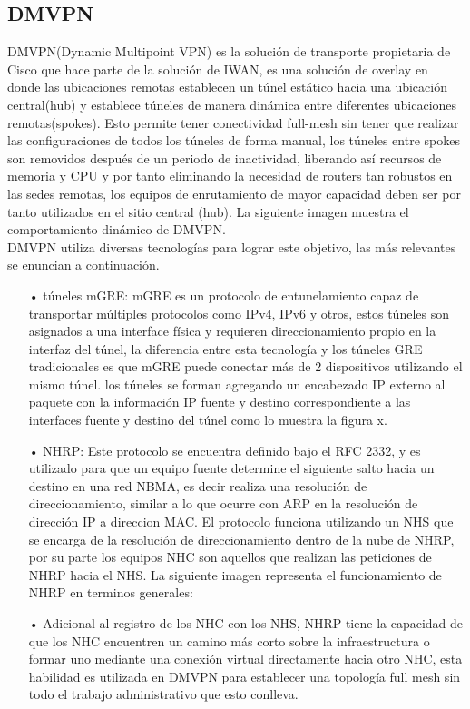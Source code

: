 \subsection{DMVPN}
\label{sec:DMVPN}

DMVPN(Dynamic Multipoint VPN) es la solución de transporte propietaria de Cisco que hace parte de la solución de IWAN, es una solución de overlay en donde las ubicaciones remotas establecen un túnel estático hacia una ubicación central(hub) y establece túneles de manera dinámica entre diferentes ubicaciones remotas(spokes). Esto permite tener conectividad full-mesh sin tener que realizar las configuraciones de todos los túneles de forma manual, los túneles entre spokes son removidos después de un periodo de inactividad, liberando así recursos de memoria y CPU y por tanto eliminando la necesidad de routers tan robustos en las sedes remotas, los equipos de enrutamiento de mayor capacidad deben ser por tanto utilizados en el sitio central (hub). La siguiente imagen muestra el comportamiento dinámico de DMVPN.
\\
DMVPN utiliza diversas tecnologías para lograr este objetivo, las más relevantes se enuncian a continuación.


\begin{itemize}
\item[•]túneles mGRE: mGRE es un protocolo de entunelamiento capaz de transportar múltiples protocolos como IPv4, IPv6 y otros, estos túneles son asignados a una interface física y requieren direccionamiento propio en la interfaz del túnel, la diferencia entre esta tecnología y los túneles GRE tradicionales es que mGRE puede conectar más de 2 dispositivos utilizando el mismo túnel.  
los túneles se forman agregando un encabezado IP externo al paquete con la información IP fuente y destino correspondiente a las interfaces fuente y destino del túnel como lo muestra la figura x.
\item[•]NHRP:  Este protocolo se encuentra definido bajo el RFC 2332, y es utilizado para que un equipo fuente determine el siguiente salto hacia un destino en una red NBMA, es decir realiza una resolución de direccionamiento, similar a lo que ocurre con ARP en la resolución de dirección IP a direccion MAC. El protocolo funciona utilizando un NHS que se encarga de la resolución de direccionamiento dentro de la nube de NHRP, por su parte los equipos NHC son aquellos que realizan las peticiones de NHRP hacia el NHS.
La siguiente imagen representa el funcionamiento de NHRP en terminos generales:
\item[•]Adicional al registro de los NHC con los NHS, NHRP tiene la capacidad de que los NHC encuentren un camino más corto sobre la infraestructura o formar uno mediante una conexión virtual directamente hacia otro NHC, esta habilidad es utilizada en DMVPN para establecer una topología full mesh sin todo el trabajo administrativo que esto conlleva.
\end{itemize}

